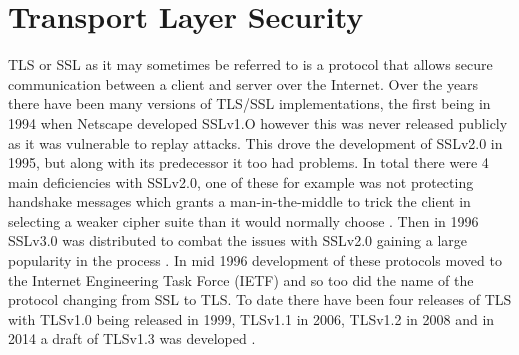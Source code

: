 \documentclass[a4wide,leqno,12pt]{report}
\begin{document}
\section{Transport Layer Security}
TLS or SSL as it may sometimes be referred to is a protocol that allows secure communication between a client and server over the Internet. Over the years there have been many versions of TLS/SSL implementations, the first being in 1994 when Netscape developed SSLv1.O however this was never released publicly as it was vulnerable to replay attacks\cite{turner2014transport}. This drove the development of SSLv2.0 in 1995, but along with its predecessor it too had problems. In total there were 4 main deficiencies with SSLv2.0, one of these for example was not protecting handshake messages which grants a man-in-the-middle to trick the client in selecting a weaker cipher suite than it would normally choose \cite{turner2011prohibiting}. Then in 1996 SSLv3.0 was distributed to combat the issues with SSLv2.0 gaining a large popularity in the process \cite{turner2014transport}. In mid 1996 development of these protocols moved to the Internet Engineering Task Force (IETF) and so too did the name of the protocol changing from SSL to TLS. To date there have been four releases of TLS with TLSv1.0 being released in 1999, TLSv1.1 in 2006, TLSv1.2 in 2008\cite{turner2014transport} and in 2014 a draft of TLSv1.3 was developed
 \cite{dierks2014transport}.\\
\end{document}
